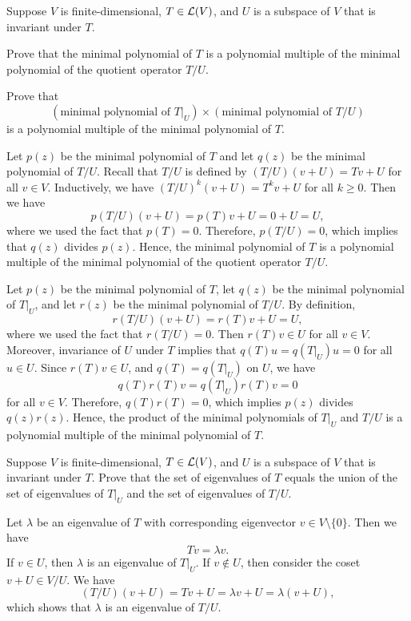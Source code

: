 \begin{exc}
\begin{exercise}
Suppose $V$ is finite-dimensional, $T\in\mathcal{L}(V)$, and $U$ is a subspace of $V$
that is invariant under $T$.
\begin{parts}
\item Prove that the minimal polynomial of $T$ is a polynomial multiple of the
  minimal polynomial of the quotient operator $T/U$.
\item Prove that
  \[ (\text{minimal polynomial of } T|_U)\times(\text{minimal polynomial of }
     T/U) \]
  is a polynomial multiple of the minimal polynomial of $T$.
\end{parts}
\end{exercise}
\begin{solution}\leavevmode
\begin{parts}
\item Let $p(z)$ be the minimal polynomial of $T$ and let $q(z)$ be the
  minimal polynomial of $T/U$. Recall that $T/U$ is defined by
  $(T/U)(v+U)=Tv+U$ for all $v\in V$. Inductively, we have
  $(T/U)^k(v+U)=T^kv+U$ for all $k\ge0$. Then we have
  \[ p(T/U)(v+U)=p(T)v+U=0+U=U, \]
  where we used the fact that $p(T)=0$. Therefore, $p(T/U)=0$, which implies
  that $q(z)$ divides $p(z)$. Hence, the minimal polynomial of $T$ is a
  polynomial multiple of the minimal polynomial of the quotient operator
  $T/U$.
\item Let $p(z)$ be the minimal polynomial of $T$, let $q(z)$ be the minimal
  polynomial of $T|_U$, and let $r(z)$ be the minimal polynomial of $T/U$. By
  definition,
  \[ r(T/U)(v+U)=r(T)v+U=U, \]
  where we used the fact that $r(T/U)=0$. Then $r(T)v\in U$ for all $v\in V$.
  Moreover, invariance of $U$ under $T$ implies that $q(T)u=q(T|_U)u=0$ for
  all $u\in U$. Since $r(T)v\in U$, and $q(T)=q(T|_U)$ on $U$, we have
  \[ q(T)r(T)v=q(T|_U)r(T)v=0 \]
  for all $v\in V$. Therefore, $q(T)r(T)=0$, which implies $p(z)$ divides
  $q(z)r(z)$. Hence, the product of the minimal polynomials of $T|_U$ and
  $T/U$ is a polynomial multiple of the minimal polynomial of $T$. \qedhere
\end{parts}
\end{solution}

\begin{exercise}
Suppose $V$ is finite-dimensional, $T\in\mathcal{L}(V)$, and $U$ is a subspace of $V$
that is invariant under $T$. Prove that the set of eigenvalues of $T$ equals
the union of the set of eigenvalues of $T|_U$ and the set of eigenvalues of
$T/U$.
\end{exercise}
\begin{solution}
Let $\lambda$ be an eigenvalue of $T$ with corresponding eigenvector
$v\in V\setminus\{0\}$. Then we have
\[ Tv=\lambda v. \]
If $v\in U$, then $\lambda$ is an eigenvalue of $T|_U$. If $v\notin U$, then
consider the coset $v+U\in V/U$. We have
\[ (T/U)(v+U)=Tv+U=\lambda v+U=\lambda(v+U), \]
which shows that $\lambda$ is an eigenvalue of $T/U$.


\end{solution}
\end{exc}
